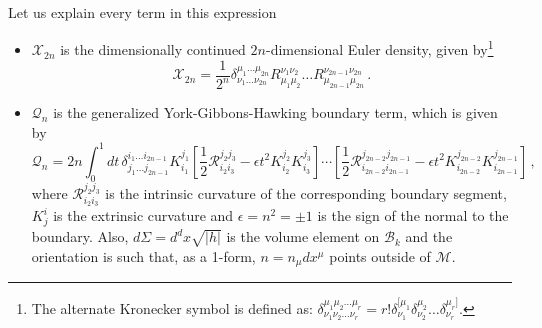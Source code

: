 \documentclass[11pt,letterpaper]{article}
\begin{document}
Let us explain every term in this expression
\begin{itemize}
\item{$\mathcal{X}_{2n}$ is the dimensionally continued $2n$-dimensional Euler density, given by\footnote{The alternate Kronecker symbol is defined as: $\delta^{\mu_1\mu_2\dots \mu_r}_{\nu_1\nu_2\dots\nu_r}= r!\delta^{[\mu_1}_{\nu_1}\delta^{\mu_2}_{\nu_2}\dots \delta^{\mu_r]}_{\nu_r}$.
}
\begin{equation}
\mathcal{X}_{2n}= \frac{1}{2^{n}}\delta^{\mu_1\dots \mu_{2n}}_{\nu_1\dots \nu_{2n}}R^{\nu_1\nu_2}_{\mu_1\mu_2}\dots R^{\nu_{2n-1}\nu_{2n}}_{\mu_{2n-1}\mu_{2n}}\, .
\end{equation}}
\item{$\mathcal{Q}_{n}$ is the generalized York-Gibbons-Hawking boundary term, which is given by
\begin{equation}
\mathcal{Q}_{n}=2n\int_0^1dt\, \delta^{i_1\dots i_{2n-1}}_{j_1\dots j_{2n-1}}K^{j_1}_{i_1}\left[\frac{1}{2}\mathcal{R}^{j_2 j_3}_{i_2i_3}-\epsilon t^2K^{j_2}_{i_2}K^{j_3}_{i_3}\right]\cdots \left[\frac{1}{2}\mathcal{R}^{j_{2n-2}j_{2n-1}}_{i_{2n-2}i_{2n-1}}-\epsilon t^2K^{j_{2n-2}}_{i_{2n-2}}K^{j_{2n-1}}_{i_{2n-1}}\right]\, ,
\label{Qterm1}
\end{equation}
where $\mathcal{R}^{j_2 j_3}_{i_2i_3}$ is the intrinsic curvature of the corresponding boundary segment, $K^{i}_{j}$ is the extrinsic curvature and $\epsilon=n^2=\pm 1$ is the sign of the normal to the boundary. Also, $d\Sigma=d^dx\sqrt{|h|}$ is the volume element on $\mathcal{B}_k$ and the orientation is such that, as a 1-form, $n=n_{\mu}dx^{\mu}$ points outside of $\mathcal{M}$.
}


\end{itemize}
\end{document}
